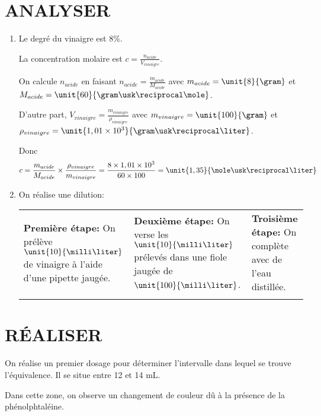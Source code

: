 \documentclass[a4paper,10pt]{article}
\begin{document}
\thispagestyle{fancy}
\section{ANALYSER}
\begin{enumerate}
    \item Le degré du vinaigre est 8\%.
    
    La concentration molaire est $c=\frac{n_{acide}}{V_{vinaigre}}$.
    
    On calcule $n_{acide}$ en faisant $n_{acide}=\frac{m_{acide}}{M_{acide}}$ avec $m_{acide}=\unit{8}{\gram}$ et $M_{acide}=\unit{60}{\gram\usk\reciprocal\mole}$. 
    
    D'autre part, $V_{vinaigre}=\frac{m_{vinaigre}}{\rho_{vinaigre}}$ avec $m_{vinaigre}=\unit{100}{\gram}$ et $\rho_{vinaigre}=\unit{1,01\times 10^3}{\gram\usk\reciprocal\liter}$.
    
    Donc
    \[
    c=\frac{m_{acide}}{M_{acide}}\times \frac{\rho_{vinaigre}}{m_{vinaigre}}=\frac{8\times 1,01\times 10^3}{60\times 100}=\unit{1,35}{\mole\usk\reciprocal\liter}
    \]
    \item On réalise une dilution:
    
    \begin{tabular}{p{5cm}|p{5cm}|p{5cm}}
        \textbf{Première étape: } On prélève $\unit{10}{\milli\liter}$ de vinaigre à l'aide d'une pipette jaugée. &  \textbf{Deuxième étape: }On verse les $\unit{10}{\milli\liter}$ prélevés dans une fiole jaugée de $\unit{100}{\milli\liter}$.&\textbf{Troisième étape: }On complète avec de l'eau distillée.\\
            \def\svgwidth{3cm}
            
        & 
            \def\svgwidth{4cm}
            
        & 
            \def\svgwidth{4.5cm}
            
       \\
    \end{tabular}
\end{enumerate}
\section{RÉALISER}
On réalise un premier dosage pour déterminer l'intervalle dans lequel se trouve l'équivalence. Il se situe entre 12 et 14 mL.

Dans cette zone, on observe un changement de couleur dû à la présence de la phénolphtaléine.
\end{document}
